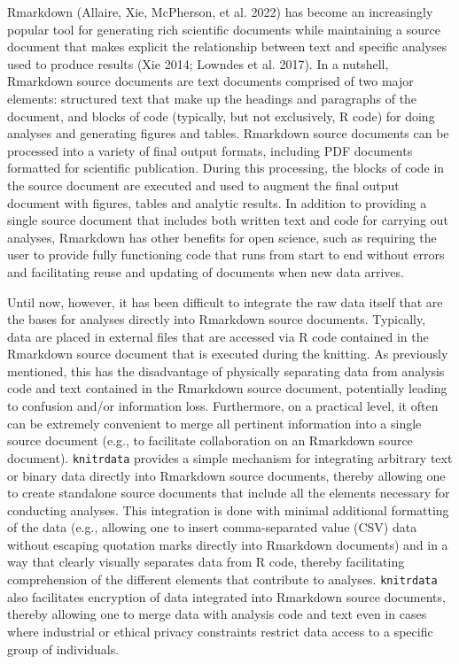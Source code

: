 Rmarkdown (Allaire, Xie, McPherson, et al. 2022) has become an increasingly popular tool for generating rich scientific documents while maintaining a source document that makes explicit the relationship between text and specific analyses used to produce results (Xie 2014; Lowndes et al. 2017). In a nutshell, Rmarkdown source documents are text documents comprised of two major elements: structured text that make up the headings and paragraphs of the document, and blocks of code (typically, but not exclusively, R code) for doing analyses and generating figures and tables. Rmarkdown source documents can be processed into a variety of final output formats, including PDF documents formatted for scientific publication. During this processing, the blocks of code in the source document are executed and used to augment the final output document with figures, tables and analytic results. In addition to providing a single source document that includes both written text and code for carrying out analyses, Rmarkdown has other benefits for open science, such as requiring the user to provide fully functioning code that runs from start to end without errors and facilitating reuse and updating of documents when new data arrives.

Until now, however, it has been difficult to integrate the raw data itself that are the bases for analyses directly into Rmarkdown source documents. Typically, data are placed in external files that are accessed via R code contained in the Rmarkdown source document that is executed during the knitting. As previously mentioned, this has the disadvantage of physically separating data from analysis code and text contained in the Rmarkdown source document, potentially leading to confusion and/or information loss. Furthermore, on a practical level, it often can be extremely convenient to merge all pertinent information into a single source document (e.g., to facilitate collaboration on an Rmarkdown source document). \texttt{knitrdata} provides a simple mechanism for integrating arbitrary text or binary data directly into Rmarkdown source documents, thereby allowing one to create standalone source documents that include all the elements necessary for conducting analyses. This integration is done with minimal additional formatting of the data (e.g., allowing one to insert comma-separated value (CSV) data without escaping quotation marks directly into Rmarkdown documents) and in a way that clearly visually separates data from R code, thereby facilitating comprehension of the different elements that contribute to analyses. \texttt{knitrdata} also facilitates encryption of data integrated into Rmarkdown source documents, thereby allowing one to merge data with analysis code and text even in cases where industrial or ethical privacy constraints restrict data access to a specific group of individuals.

